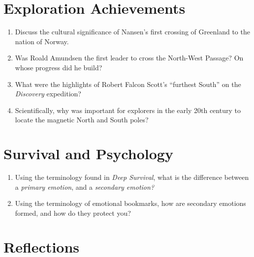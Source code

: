 \documentclass[10pt]{article}
\begin{document}
\section{Exploration Achievements}

\begin{enumerate}
\item Discuss the cultural significance of Nansen's first crossing of Greenland to the nation of Norway. \\ \vspace{2cm}
\item Was Roald Amundsen the first leader to cross the North-West Passage? On whose progress did he build? \\ \vspace{2cm}
\item What were the highlights of Robert Falcon Scott's ``furthest South'' on the \textit{Discovery} expedition? \\ \vspace{2cm}
\item Scientifically, why was important for explorers in the early 20th century to locate the magnetic North and South poles? \\ \vspace{2cm}
\end{enumerate}

\section{Survival and Psychology}

\begin{enumerate}
\item Using the terminology found in \textit{Deep Survival}, what is the difference between a \textit{primary emotion}, and a \textit{secondary emotion?} \\ \vspace{1cm}
\item Using the terminology of emotional bookmarks, how are secondary emotions formed, and how do they protect you? \\ \vspace{3cm}
\end{enumerate}

\section{Reflections}
\end{document}
